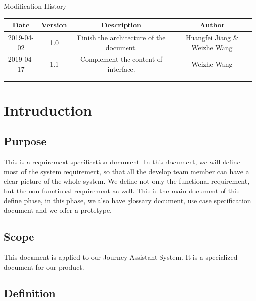 \documentclass[10pt]{article}
\begin{document}
\newpage

\begin{center}
    {\LARGE Modification History}
    
    \begin{tabular}{|c|c|c|c|} 
        \hline 
        Date&Version&Description&Author\\
        \hline  
        2019-04-02&1.0&Finish the architecture of the document.&Huangfei Jiang \& Weizhe Wang\\
		\hline 
		2019-04-17&1.1&Complement the content of interface.&Weizhe Wang\\
		\hline
		& & & \\
		\hline
		& & & \\
		\hline
    \end{tabular}    
\end{center}

\newpage

\tableofcontents
\newpage

\section{Intruduction}
\subsection{Purpose}
This is a requirement specification document. In this document, we will define most of the system requirement, so that all the develop team member can have a clear picture of the whole system. We define not only the functional requirement, but the non-functional requirement as well. This is the main document of this define phase, in this phase, we also have glossary document, use case specification document and we offer a prototype.

\subsection{Scope}
This document is applied to our Journey Assistant System. It is a specialized document for our product.

\subsection{Definition}
\end{document}
